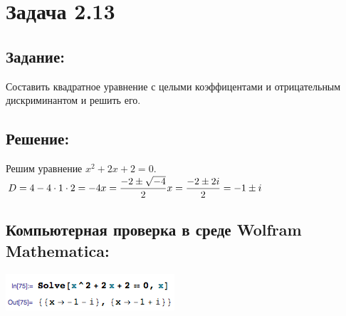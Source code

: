 \section{Задача 2.13}
\subsection{Задание:}
Составить квадратное уравнение с целыми коэффицентами и отрицательным дискриминантом и решить его.
\subsection{Решение:}
Решим уравнение $ x^2 + 2x + 2 = 0 $.
\\
$
	D = 4 - 4 \cdot 1 \cdot 2 = -4
	\\[1em]
	x = \dfrac{-2 \pm \sqrt{-4}}{2}
	\\[1em]
	x = \dfrac{-2 \pm 2i}{2} = -1 \pm i
$
\subsection{Компьютерная проверка в среде Wolfram Mathematica:}
\includegraphics[scale=0.6]{task/2_13/screen.png}
